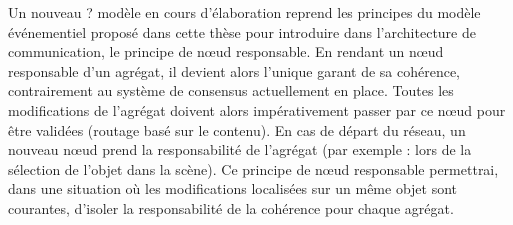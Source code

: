 Un nouveau ? modèle en cours d'élaboration reprend les principes du modèle événementiel 
proposé dans cette thèse pour introduire dans l'architecture de communication, le 
principe de \og n\oe ud responsable\fg{}. En rendant un n\oe ud responsable d'un 
agrégat, il devient alors l'unique garant de sa cohérence, contrairement au 
système de consensus actuellement en place. Toutes les modifications de 
l'agrégat doivent alors impérativement passer par ce n\oe ud pour être validées 
(routage basé sur le contenu). 
En cas de départ du réseau, un nouveau n\oe ud prend la responsabilité de 
l'agrégat (par exemple : lors de la sélection de l'objet dans la scène). 
Ce principe de \og n\oe ud responsable\fg{} permettrai, dans une situation où les 
modifications localisées sur un même objet sont courantes, d'isoler la 
responsabilité de la cohérence pour chaque agrégat. 


%


